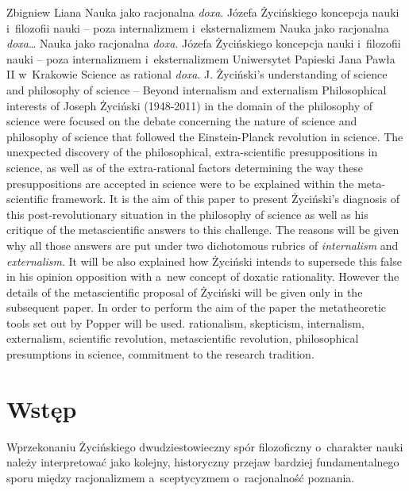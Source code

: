 \begin{artplenv}{Zbigniew Liana}
	{Nauka jako racjonalna \textit{doxa}. Józefa Życińskiego koncepcja nauki i~filozofii nauki -- poza internalizmem i~eksternalizmem}
	{Nauka jako racjonalna \textit{doxa}\ldots}
	{Nauka jako racjonalna \textit{doxa}. Józefa Życińskiego koncepcja nauki i~filozofii nauki -- poza internalizmem i~eksternalizmem}
	{Uniwersytet Papieski Jana Pawła II w~Krakowie}
	{Science as rational \textit{doxa}. J. Życiński's understanding of science and philosophy of science -- Beyond internalism and externalism}
	{Philosophical interests of Joseph Życiński (1948-2011) in the domain of the philosophy of science were focused on the
		debate concerning the nature of science and philosophy of science that followed the Einstein-Planck revolution in
		science. The unexpected discovery of the philosophical, extra-scientific  presuppositions in science, as well as of the
		extra-rational factors determining the way these presuppositions are accepted in science were to be explained within
		the meta-scientific framework. It is the aim of this paper to present Życiński's diagnosis of this post-revolutionary
		situation in the philosophy of science as well as his critique of the metascientific answers to this challenge. The
		reasons will be given why all those answers are put under two dichotomous rubrics of \textit{internalism} and
		\textit{externalism}. It will be also explained how Życiński intends to supersede this false in his opinion opposition
		with a~new concept of doxatic rationality. However the details of the metascientific proposal of Życiński will be given
		only in the subsequent paper. In order to perform the aim of the paper the metatheoretic tools set out by Popper
		\parencite*{popper_beiden_1979}
		will be used.}
	{rationalism, skepticism, internalism, externalism, scientific revolution, metascientific revolution, philosophical
		presumptions in science, commitment to the research tradition.}


\section*{Wstęp}

\lettrine[loversize=0.13,lines=2,lraise=-0.05,nindent=0em,findent=0.2pt]%
{W}{}przekonaniu Życińskiego dwudziestowieczny spór filozoficzny o~charakter nauki należy interpretować jako kolejny,
historyczny przejaw bardziej fundamentalnego sporu między racjonalizmem a~sceptycyzmem o~racjonalność poznania.


\end{artplenv}
